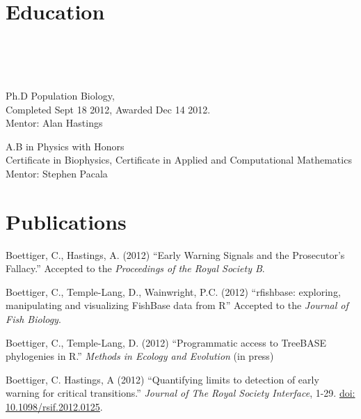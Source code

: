 \documentclass[margin]{res}
\begin{document}
\begin{resume}


\section{Education}
\begin{format}
\\\\
\body\\
\end{format}

\begin{position}
Ph.D Population Biology, \\
Completed Sept 18 2012, Awarded Dec 14 2012. \\
Mentor: Alan Hastings
\end{position}

\begin{position}
A.B  in Physics with Honors \\ 
Certificate in Biophysics, Certificate in Applied and Computational Mathematics\\
Mentor: Stephen Pacala
\end{position}

\section{Publications}

Boettiger, C., Hastings, A. (2012) ``Early Warning Signals and the Prosecutor's Fallacy.'' Accepted to the {\it Proceedings of the Royal Society B}.

Boettiger, C., Temple-Lang, D., Wainwright, P.C. (2012) ``rfishbase: exploring, manipulating and visualizing FishBase data from R'' Accepted to the {\it Journal of Fish Biology}.

Boettiger, C., Temple-Lang, D. (2012)  ``Programmatic access to TreeBASE phylogenies in R.'' {\it Methods in Ecology and Evolution} (in press)

Boettiger, C. Hastings, A (2012) ``Quantifying limits to detection of early warning for critical transitions.'' {\it Journal of The Royal Society Interface}, 1-29. \href{http://dx.doi.org/10.1098/rsif.2012.0125}{doi: 10.1098/rsif.2012.0125}.


\end{resume}
\end{document}
